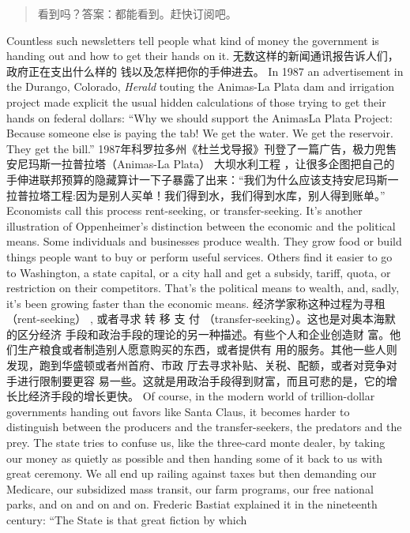 \begin{paracol}{2}
\begin{quote}
看到吗？答案：都能看到。赶快订阅吧。
\end{quote}
\switchcolumn*
Countless such newsletters tell people what kind of money the
government is handing out and how to get their hands on it.
\switchcolumn
无数这样的新闻通讯报告诉人们，政府正在支出什么样的
钱以及怎样把你的手伸进去。
\switchcolumn*
In 1987 an advertisement in the Durango, Colorado, \textit{Herald}
touting the Animas-La Plata dam and irrigation project made
explicit the usual hidden calculations of those trying to get their
hands on federal dollars: ``Why we should support the AnimasLa Plata Project: Because someone else is paying the tab! We
get the water. We get the reservoir. They get the bill.''
\switchcolumn
1987年科罗拉多州《杜兰戈导报》刊登了一篇广告，极力兜售安尼玛斯一拉普拉塔（Animas-La Plata） 大坝水利工程 ，让很多企图把自己的手伸进联邦预算的隐藏算计一下子暴露了出来：“我们为什么应该支持安尼玛斯一拉普拉塔工程:因为是别人买单！我们得到水，我们得到水库，别人得到账单。”
\switchcolumn*
Economists call this process rent-seeking, or transfer-seeking. It's another illustration of Oppenheimer's distinction between the economic and the political means. Some individuals
and businesses produce wealth. They grow food or build things
people want to buy or perform useful services. Others find it
easier to go to Washington, a state capital, or a city hall and get
a subsidy, tariff, quota, or restriction on their competitors.
That's the political means to wealth, and, sadly, it's been growing faster than the economic means.
\switchcolumn
经济学家称这种过程为寻租（rent-seeking） , 或者寻求
转 移 支 付 （transfer-seeking）。这也是对奥本海默的区分经济
手段和政治手段的理论的另一种描述。有些个人和企业创造财
富。他们生产粮食或者制造别人愿意购买的东西，或者提供有
用的服务。其他一些人则发现，跑到华盛顿或者州首府、市政
厅去寻求补贴、关税、配额，或者对竞争对手进行限制要更容
易一些。这就是用政治手段得到财富，而且可悲的是，它的增
长比经济手段的增长更快。
\switchcolumn*
Of course, in the modern world of trillion-dollar governments
handing out favors like Santa Claus, it becomes harder to distinguish between the producers and the transfer-seekers, the predators and the prey. The state tries to confuse us, like the three-card
monte dealer, by taking our money as quietly as possible and
then handing some of it back to us with great ceremony. We all
end up railing against taxes but then demanding our Medicare,
our subsidized mass transit, our farm programs, our free national
parks, and on and on and on. Frederic Bastiat explained it in the
nineteenth century: ``The State is that great fiction by which

\end{paracol}
